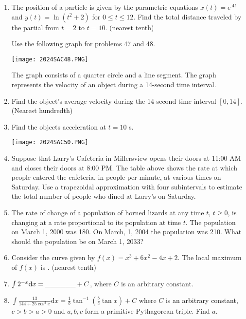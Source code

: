 \documentclass[../uilmath.tex]{subfiles}
\begin{document}
\begin{enumerate}[label=\bfseries\arabic*.]
    \item %
    The position of a particle is given by the parametric equations $x(t)= e^{.4t}$ and $y(t)=\ln(t^2+2)$ for $0\leq t\leq 12$. Find the 
    total distance traveled by the partial from $t=2$ to $t=10$. (nearest tenth)


    Use the following graph for problems 47 and 48.
    \begin{center}
        \texttt{[image: 2024SAC48.PNG]}
    \end{center}
    The graph consists of a quarter circle and a line segment. The graph represents the velocity of an object during a 14-second time interval.
    \item %
    Find the object's average velocity during the 14-second time interval $[0,14]$. (Nearest hundredth)

    \item %
    Find the objects acceleration at $t=10$ s.


    \begin{center}
        \texttt{[image: 2024SAC50.PNG]}
    \end{center}
    \item %
    Suppose that Larry's Cafeteria in Millersview opens their doors at 11:00 AM and closes their doors at 8:00 PM.
    The table above shows the rate at which people entered the cafeteria, in people per minute, at various times on Saturday.
    Use a trapezoidal approximation with four subintervals to estimate the total number of people who dined at Larry's on Saturday.

    \item %
    The rate of change of a population of horned lizards at any time $t$, $t\geq 0$, is changing at a rate proportional to 
    its population at time $t$. The population on March 1, 2000 was 180. On March, 1, 2004 the population was 210. What should the population be on March 1, 2033?

    \item %
    Consider the curve given by $f(x)=x^3+6x^2-4x+2$. The local maximum of $f(x)$ is \blank. (nearest tenth)

    \item %
    $\int 2^{-x}\mathrm{d}x=\_\_\_\_\_\_ + C$, where $C$ is an arbitrary constant.

    \item %
    $\int \frac{13}{144+25\cos^2 x}\mathrm{d}x=\frac{1}{b}\tan^{-1}(\frac{b}{c}\tan x)+C$ where $C$ is an arbitrary constant,
    $c>b>a>0$ and $a,b,c$ form a primitive Pythagorean triple. Find $a$.


\end{enumerate}
\end{document}
